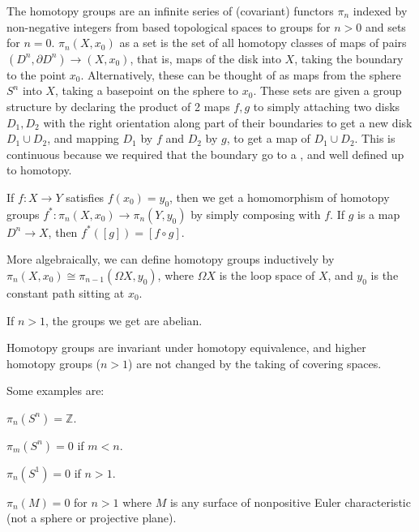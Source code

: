 \documentclass{article}
\begin{document}
The homotopy groups are an infinite series of (covariant) functors $\pi_n$ indexed by non-negative integers from based topological spaces to groups for $n>0$ and sets for $n=0$.  $\pi_n(X,x_0)$ as a set is the set of all homotopy classes of maps of pairs $(D^n,\partial D^n)\to (X,x_0)$, that is, maps of the disk into $X$, taking the boundary to the point $x_0$.  Alternatively, these can be thought of as maps from the sphere $S^n$ into $X$, taking a basepoint on the sphere 
to $x_0$.  These sets are given a group structure by declaring the product of 2 maps $f,g$ to simply attaching two disks $D_1,D_2$ with the right orientation along part of their boundaries to get a new disk $D_1\cup D_2$, and mapping $D_1$ by $f$ and $D_2$ by $g$, to get a map of $D_1\cup D_2$.  This is continuous because we required that the boundary go to a , and well defined up to homotopy.

If $f:X\to Y$ satisfies $f(x_0)=y_0$, then we get a homomorphism of homotopy groups $f^*:\pi_n(X,x_0)\to\pi_n(Y,y_0)$ by simply composing with $f$.  If $g$ is a map $D^n\to X$,  then $f^*([g])=[f\circ g]$.

More algebraically, we can define homotopy groups inductively by 
$\pi_n(X,x_0)\cong\pi_{n-1}(\Omega X,y_0)$, where $\Omega X$ is the loop space of $X$, and $y_0$ is the constant path sitting at $x_0$.

If $n>1$, the groups we get are abelian.

Homotopy groups are invariant under homotopy equivalence, and higher homotopy groups ($n>1$) 
are not changed by the taking of covering spaces.  

Some examples are:

$\pi_n(S^n)=\mathbb{Z}$.

$\pi_m(S^n)=0$ if $m<n$.

$\pi_n(S^1)=0$ if $n>1$.

$\pi_n(M)=0$ for $n>1$ where $M$ is any surface of nonpositive Euler characteristic 
(not a sphere or projective plane).
\end{document}
